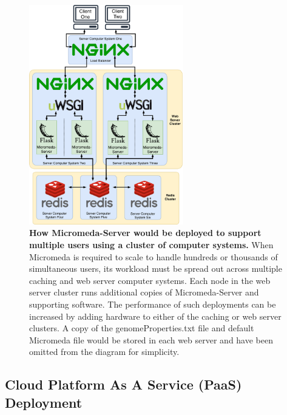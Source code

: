 \begin{figure}[!ht]
  \centering
	\includegraphics[width=0.60\textwidth]{media/micromeda-heavy-deployment.pdf}
	 \caption[How Micromeda-Server would be deployed to support multiple users 
using a cluster of computer systems.]{\textbf{How Micromeda-Server would be 
deployed to support multiple users using a cluster of computer systems.} When 
Micromeda is required to scale to handle hundreds or thousands of simultaneous 
users, its workload must be spread out across multiple caching and web server 
computer systems. Each node in the web server cluster runs additional copies of 
Micromeda-Server and supporting software. The performance of such deployments 
can be increased by adding hardware to either of the caching or web server 
clusters.  A copy of the genomeProperties.txt file and default Micromeda file 
would be stored in each web server and have been omitted from the diagram for 
simplicity.}
	 \label{fig:micromeda-large-deploy}
\end{figure}

\subsection{Cloud Platform As A Service (PaaS) Deployment}


